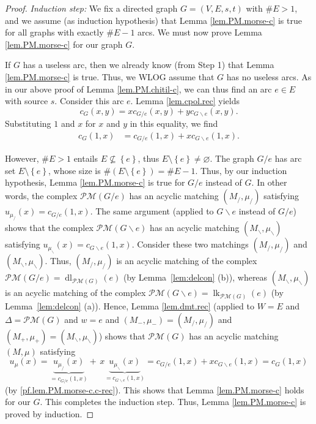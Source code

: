 \documentclass[12pt]{amsart}
\theoremstyle{definition}
\DeclareMathOperator{\lk}{lk}
\DeclareMathOperator{\dl}{dl}
\newcommand{\Pm}[1]{\mathcal{PM}\left(#1\right)}
\begin{document}
\begin{proof}
\textit{Induction step:} We fix a directed graph $G=\left(  V,E,s,t\right)  $
with $\#E>1$, and we assume (as induction hypothesis) that Lemma
\ref{lem.PM.morse-c} is true for all graphs with exactly $\#E-1$ arcs.
We must now prove Lemma \ref{lem.PM.morse-c} for our graph $G$.

If $G$ has a useless arc, then we already know (from Step 1) that Lemma
\ref{lem.PM.morse-c} is true. Thus, we WLOG assume that $G$ has no useless
arcs. As in our above proof of Lemma \ref{lem.PM.chitil-c}, we can thus find
an arc $e\in E$ with source $s$. Consider this arc $e$. Lemma
\ref{lem.cpol.rec} yields%
\[
c_{G}\left(  x,y\right)  =xc_{G/e}\left(  x,y\right)  +yc_{G\backslash
e}\left(  x,y\right)  .
\]
Substituting $1$ and $x$ for $x$ and $y$ in this equality, we find%
\begin{align}
c_{G}\left(  1,x\right)
& =c_{G/e}\left(  1,x\right)  +xc_{G\backslash e}\left(  1,x\right)
.\label{pf.lem.PM.morse-c.c-rec}%
\end{align}


However, $\#E>1$ entails $E\not \subseteq \left\{  e\right\}  $, thus
$E\setminus\left\{  e\right\}  \neq\varnothing$. The graph $G/e$ has arc set
$E\setminus\left\{  e\right\}  $, whose size is $\#\left(  E\setminus\left\{
e\right\}  \right)  =\#E-1$. Thus, by our induction hypothesis, Lemma
\ref{lem.PM.morse-c} is true for $G/e$ instead of $G$. In other words, the
complex $\Pm{G/e}  $ has an acyclic matching $\left(
M_{/},\mu_{/}\right)  $ satisfying $u_{\mu_{/}}\left(  x\right)
=c_{G/e}\left(  1,x\right)  $. The same argument (applied to $G\backslash e$
instead of $G/e$) shows that the complex $\Pm{G\backslash e}$ has an
acyclic matching $\left(  M_{\backslash},\mu_{\backslash
}\right)  $ satisfying $u_{\mu_{\backslash}}\left(  x\right)  =c_{G\backslash
e}\left(  1,x\right)  $. Consider these two matchings $\left(  M_{/},\mu
_{/}\right)  $ and $\left(  M_{\backslash},\mu_{\backslash}\right)  $. Thus,
$\left(  M_{/},\mu_{/}\right)  $ is an acyclic matching of the complex
$\Pm{G/e}  =\dl_{\Pm{G}}\left(  e\right)  $ (by
Lemma~\ref{lem:delcon} (b)), whereas $\left(  M_{\backslash},\mu_{\backslash
}\right)  $ is an acyclic matching of the complex $\Pm{G\backslash e}
=\lk_{\Pm{G}}\left(  e\right)  $ (by
Lemma~\ref{lem:delcon} (a)). Hence, Lemma \ref{lem.dmt.rec} (applied to $W=E$
and $\Delta=\Pm{G}$ and $w=e$ and $\left(  M_-%
,\mu_-\right)  =\left(  M_{/},\mu_{/}\right)  $ and $\left(  M_+,\mu
_+\right)  =\left(  M_{\backslash},\mu_{\backslash}\right)  $) shows that
$\Pm{G}$ has an acyclic matching $\left(
M,\mu\right)  $ satisfying%
\[
u_{\mu}\left(  x\right)  =\underbrace{u_{\mu_{/}}\left(  x\right)  }%
_{=c_{G/e}\left(  1,x\right)  }+\,x\underbrace{u_{\mu_{\backslash}}\left(
x\right)  }_{=c_{G\backslash e}\left(  1,x\right)  }=c_{G/e}\left(
1,x\right)  +xc_{G\backslash e}\left(  1,x\right)  =c_{G}\left(  1,x\right)
\]
(by \eqref{pf.lem.PM.morse-c.c-rec}). This shows that Lemma
\ref{lem.PM.morse-c} holds for our $G$. This completes the induction step.
Thus, Lemma \ref{lem.PM.morse-c} is proved by induction.
\end{proof}
\end{document}
